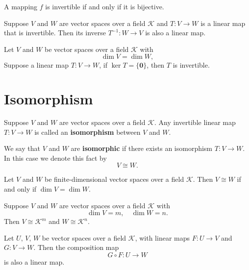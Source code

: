 \begin{propositionenv}
	A mapping $f$ is invertible if and only if it is bijective.
\end{propositionenv}

\begin{theoremenv}
	Suppose $V$ and $W$ are vector spaces over a field $\mathcal{K}$ and $T: V \to W$ is a linear map that is invertible. Then its inverse $T^{-1}: W \to V$ is also a linear map.
\end{theoremenv}

\begin{theoremenv}
	Let $V$ and $W$ be vector spaces over a field $\mathcal{K}$ with
	\[\dim V = \dim W,\]
	Suppose a linear map $T:V \to W$, if $\ker T = \{\bm{0}\}$, then $T$ is invertible.
\end{theoremenv}

\section{Isomorphism}
\begin{definitionenv}
	Suppose $V$ and $W$ are vector spaces over a field $\mathcal{K}$. Any invertible linear map $T: V \to W$ is called an \textbf{isomorphism} between $V$ and $W$.
\end{definitionenv}
\begin{notationenv}
	We say that $V$ and $W$ are \textbf{isomorphic} if there exists an isomorphism $T : V \to W$. In this case we denote this fact by
	\[
	V \cong W .
	\]
\end{notationenv}
\begin{theoremenv}
	Let $V$ and $W$ be finite-dimensional vector spaces over a field $\mathcal{K}$. Then $V \cong W$ if and only if $\dim V = \dim W$.
\end{theoremenv}

\begin{remarkenv}
	Suppose $V$ and $W$ are vector spaces over a field $\mathcal{K}$ with
	\[
	\dim V = m, \quad \dim W = n.
	\]
	Then $V \cong \mathcal{K}^m$ and $W \cong \mathcal{K}^n$.
\end{remarkenv}

\begin{theoremenv}
	Let $U,\, V,\, W$ be vector spaces over a field $\mathcal{K}$, with linear maps $F: U \to V$ and $G: V \to W$. Then the composition map \[G \circ F: U \to W\] is also a linear map.
\end{theoremenv}


\newpage